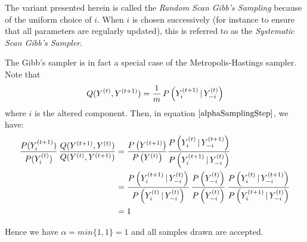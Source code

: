 	The variant presented herein is called the \textit{Random Scan Gibb's Sampling} because of the uniform choice of $i$. When $i$ is chosen successively (for instance to ensure that all parameters are regularly updated), this is referred to as the \textit{Systematic Scan Gibb's Sampler}.
	
	The Gibb's sampler is in fact a special case of the Metropolis-Hastings sampler. Note that 
	\[
		Q(Y^{(t)}, Y^{(t+1)}) = \frac{1}{m} \, P\left(Y^{(t+1)}_i \, | \, Y^{(t)}_{-i}\right)
	\]
	where $i$ is the altered component. Then, in equation $\ref{alphaSamplingStep}$, we have:
	\begin{align*}
		\frac{P(  Y^{(t+1)}_i  )}{P( Y^{(t)}_i  )} \, 
		\frac{ Q( Y^{(t+1)}, Y^{(t)})}{
			Q( Y^{(t)}, Y^{(t+1)})} &=
			\frac{P \left(Y^{(t+1)}\right)}{ P \left( Y^{(t)}  \right)}
			\frac{
				 P \left(Y^{(t)}_{i} \, | \, Y^{(t+1)}_{-i}\right)	
				}{
				P \left(Y^{(t+1)}_{i} \, | \, Y^{(t)}_{-i}\right)	
		} \\
	 &= 
	 \frac{
	 	 P \left(Y^{(t+1)}_{i} \, | \, Y^{(t)}_{-i}\right)
		  }{
		 P \left(Y^{(t)}_{i} \, | \, Y^{(t)}_{-i}\right)
 	 }
  		\,
  	\frac{
  		P \left(Y^{(t)}_{-i}\right)
  	}{
  		P \left(Y^{(t)}_{-i}\right)
	}\,
	 \frac{
	 	P \left(Y^{(t)}_{i} \, | \, Y^{(t+1)}_{-i}\right)	
	 }{
	 P \left(Y^{(t+1)}_{i} \, | \, Y^{(t)}_{-i}\right)		
	 } \\
    &= 1
	\end{align*}
	
	Hence we have $\alpha = min \{1, 1\} = 1$ and all samples drawn are accepted. 
		
	
	
	
	
	